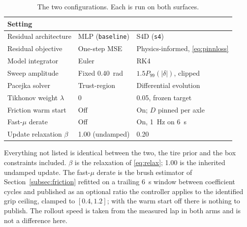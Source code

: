 \begin{table}[t]
\caption{The two configurations. Each is run on both surfaces.}
\label{tab:scenarios}
\centering
\begin{threeparttable}
\footnotesize
\setlength{\tabcolsep}{4pt}
\begin{tabular}{@{}lll@{}}
\toprule
Setting & \basearm{} & \oursarm{}\\
\midrule
Residual architecture & MLP (\texttt{baseline}) & S4D (\texttt{s4})\\
Residual objective & One-step MSE & Physics-informed,
\eqref{eq:pinnloss}\\
Model integrator & Euler & RK4\\
Sweep amplitude & Fixed \SI{0.40}{\radian} & $1.5P_{99}(|\delta|)$, clipped\\
Pacejka solver & Trust-region~\cite{branch1999trust} & Differential
evolution~\cite{storn1997de}\\
Tikhonov weight $\lambda$ & \num{0} & \num{0.05}, frozen target\\
Friction warm start & Off & On; $D$ pinned per axle\\
Fast-$\mu$ derate & Off & On, \SI{1}{\hertz} on \SI{6}{\second}\\
Update relaxation $\beta$ & \num{1.00} (undamped) & \num{0.20}\\
\bottomrule
\end{tabular}
\begin{tablenotes}[flushleft]\scriptsize
\item Everything not listed is identical between the two, the tire prior and
the box constraints included. $\beta$ is the relaxation of \eqref{eq:relax};
\num{1.00} is the inherited undamped update. The fast-$\mu$ derate is the brush
estimator of Section~\ref{subsec:friction} refitted on a trailing
\SI{6}{\second} window between coefficient cycles and published as an optional
ratio the controller applies to the identified grip ceiling, clamped to
$[\num{0.4},\num{1.2}]$; with the warm start off there is nothing to publish.
The rollout speed is taken from the measured lap in both arms and is not a
difference here.
\end{tablenotes}
\end{threeparttable}
\end{table}


